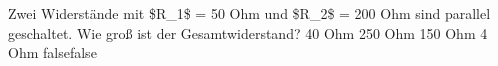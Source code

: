     {Zwei Widerstände mit \$R\_1\$ = 50 Ohm und \$R\_2\$ = 200 Ohm sind parallel geschaltet. Wie groß ist der Gesamtwiderstand?}
    {40 Ohm}
    {250 Ohm}
    {150 Ohm}
    {4 Ohm}
    {false}{false}